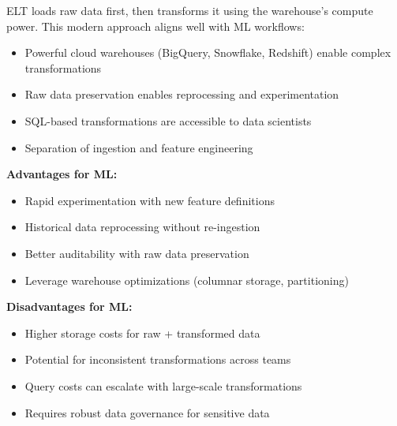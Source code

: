 ELT loads raw data first, then transforms it using the warehouse's compute power. This modern approach aligns well with ML workflows:

\begin{itemize}
    \item Powerful cloud warehouses (BigQuery, Snowflake, Redshift) enable complex transformations
    \item Raw data preservation enables reprocessing and experimentation
    \item SQL-based transformations are accessible to data scientists
    \item Separation of ingestion and feature engineering
\end{itemize}

\textbf{Advantages for ML:}
\begin{itemize}
    \item Rapid experimentation with new feature definitions
    \item Historical data reprocessing without re-ingestion
    \item Better auditability with raw data preservation
    \item Leverage warehouse optimizations (columnar storage, partitioning)
\end{itemize}

\textbf{Disadvantages for ML:}
\begin{itemize}
    \item Higher storage costs for raw + transformed data
    \item Potential for inconsistent transformations across teams
    \item Query costs can escalate with large-scale transformations
    \item Requires robust data governance for sensitive data
\end{itemize}

